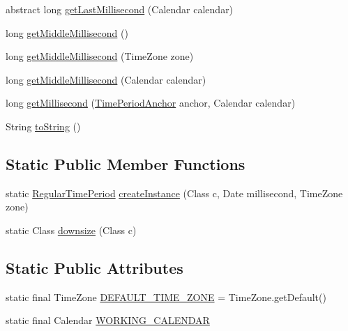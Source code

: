 \begin{DoxyCompactItemize}
abstract long \mbox{\hyperlink{classorg_1_1jfree_1_1data_1_1time_1_1_regular_time_period_a5e5b6c8eec369a8e1461021b3fa602ce}{get\+Last\+Millisecond}} (Calendar calendar)
\item 
long \mbox{\hyperlink{classorg_1_1jfree_1_1data_1_1time_1_1_regular_time_period_a2c54501dfc21d9ded93cc251344db863}{get\+Middle\+Millisecond}} ()
\item 
long \mbox{\hyperlink{classorg_1_1jfree_1_1data_1_1time_1_1_regular_time_period_a5ccb28f4990a31f2c6cd6c4e98f9ae26}{get\+Middle\+Millisecond}} (Time\+Zone zone)
\item 
long \mbox{\hyperlink{classorg_1_1jfree_1_1data_1_1time_1_1_regular_time_period_acc6989cf29e1824415f9875f04933d53}{get\+Middle\+Millisecond}} (Calendar calendar)
\item 
long \mbox{\hyperlink{classorg_1_1jfree_1_1data_1_1time_1_1_regular_time_period_a7e6e62d87f8ea991c50764f00a6b65e8}{get\+Millisecond}} (\mbox{\hyperlink{classorg_1_1jfree_1_1data_1_1time_1_1_time_period_anchor}{Time\+Period\+Anchor}} anchor, Calendar calendar)
\item 
String \mbox{\hyperlink{classorg_1_1jfree_1_1data_1_1time_1_1_regular_time_period_a7725caa0de2ab5baaba9a93d4f3123f9}{to\+String}} ()
\end{DoxyCompactItemize}
\subsection*{Static Public Member Functions}
\begin{DoxyCompactItemize}
\item 
static \mbox{\hyperlink{classorg_1_1jfree_1_1data_1_1time_1_1_regular_time_period}{Regular\+Time\+Period}} \mbox{\hyperlink{classorg_1_1jfree_1_1data_1_1time_1_1_regular_time_period_ae4cb4c7c4b520565217f7f1c5099b2ca}{create\+Instance}} (Class c, Date millisecond, Time\+Zone zone)
\item 
static Class \mbox{\hyperlink{classorg_1_1jfree_1_1data_1_1time_1_1_regular_time_period_ab2d89f9e439ba4959290bb8fbab501b9}{downsize}} (Class c)
\end{DoxyCompactItemize}
\subsection*{Static Public Attributes}
\begin{DoxyCompactItemize}
\item 
static final Time\+Zone \mbox{\hyperlink{classorg_1_1jfree_1_1data_1_1time_1_1_regular_time_period_a559e85c013cd127e53f6e8c491df16cf}{D\+E\+F\+A\+U\+L\+T\+\_\+\+T\+I\+M\+E\+\_\+\+Z\+O\+NE}} = Time\+Zone.\+get\+Default()
\item 
static final Calendar \mbox{\hyperlink{classorg_1_1jfree_1_1data_1_1time_1_1_regular_time_period_ae1eae9d84275c2518c6bbe5f11a0e1bf}{W\+O\+R\+K\+I\+N\+G\+\_\+\+C\+A\+L\+E\+N\+D\+AR}}
\end{DoxyCompactItemize}



